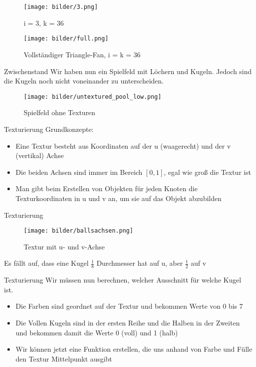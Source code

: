 \begin{frame}
\begin{figure}
	\caption{i = 3, k = 36}
	\texttt{[image: bilder/3.png]}
\end{figure}
\end{frame}
\begin{frame}
\begin{figure}
	\caption{Vollständiger Triangle-Fan, i = k = 36}
	\texttt{[image: bilder/full.png]}
\end{figure}
\end{frame}
\begin{frame}{Zwischenstand}
Wir haben nun ein Spielfeld mit Löchern und Kugeln. Jedoch sind die Kugeln noch nicht voneinander zu unterscheiden.
\begin{figure}
	\caption{Spielfeld ohne Texturen}
	\texttt{[image: bilder/untextured\_pool\_low.png]}
\end{figure}
\end{frame}
\begin{frame}{Texturierung}
Grundkonzepte:
\begin{itemize}
	\item Eine Textur besteht aus Koordinaten auf der u (waagerecht) und der v (vertikal) Achse
	\item Die beiden Achsen sind immer im Bereich $[0,1]$, egal wie groß die Textur ist
	\item Man gibt beim Erstellen von Objekten für jeden Knoten die Texturkoordinaten in u und v an, um sie auf das Objekt abzubilden
\end{itemize}
\end{frame}
\begin{frame}{Texturierung}
\begin{figure}
	\caption{Textur mit u- und v-Achse}
	\texttt{[image: bilder/ballsachsen.png]}
\end{figure}
Es fällt auf, dass eine Kugel $\frac{1}{8}$ Durchmesser hat auf u, aber $\frac{1}{2}$ auf v
\end{frame}
\begin{frame}{Texturierung}
Wir müssen nun berechnen, welcher Ausschnitt für welche Kugel ist.
	\begin{itemize}
		\item Die Farben sind geordnet auf der Textur und bekommen Werte von 0 bis 7
		\item Die Vollen Kugeln sind in der ersten Reihe und die Halben in der Zweiten und bekommen damit die Werte 0 (voll) und 1 (halb)
		\item Wir können jetzt eine Funktion erstellen, die uns anhand von Farbe und Fülle den Textur Mittelpunkt ausgibt 
	\end{itemize}
\end{frame}

